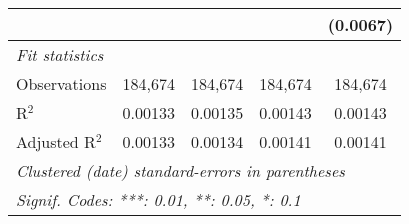 \begin{table}[H]
\begin{tabular}{lcccc}
                     &                &                &               & (0.0067)\\   
      \midrule
      \emph{Fit statistics}\\
      Observations   & 184,674        & 184,674        & 184,674       & 184,674\\  
      R$^2$          & 0.00133        & 0.00135        & 0.00143       & 0.00143\\  
      Adjusted R$^2$ & 0.00133        & 0.00134        & 0.00141       & 0.00141\\  
      \midrule \midrule
      \multicolumn{5}{l}{\emph{Clustered (date) standard-errors in parentheses}}\\
      \multicolumn{5}{l}{\emph{Signif. Codes: ***: 0.01, **: 0.05, *: 0.1}}\\
   \end{tabular}
\end{table}
